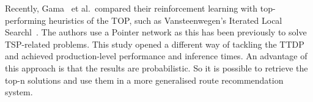 Recently, Gama~\cite{Gama2020}  et al.\ compared their reinforcement learning with
top-performing heuristics of the TOP, such as Vansteenwegen's Iterated Local
Searchl~\cite{Vansteenwegen2009}. The authors use a Pointer network as this has been
previously to solve TSP-related problems. This study opened a different way of
tackling the TTDP and achieved production-level performance and inference
times. An advantage of this approach is that the results are probabilistic. So
it is possible to retrieve the top-n solutions and use them in a more
generalised route recommendation system.


